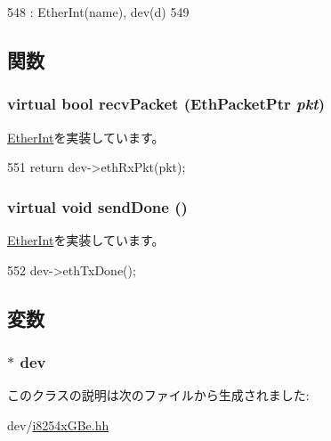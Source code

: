 \begin{DoxyCode}
548         : EtherInt(name), dev(d)
549     { }
\end{DoxyCode}


\subsection{関数}
\hypertarget{classIGbEInt_a9bd96a108d6f58f140c9f7d83726eebe}{
\subsubsection[{recvPacket}]{\setlength{\rightskip}{0pt plus 5cm}virtual bool recvPacket ({\bf EthPacketPtr} {\em pkt})}}
\label{classIGbEInt_a9bd96a108d6f58f140c9f7d83726eebe}


\hyperlink{classEtherInt_af3076ea966a2abda7735ea65e8a02034}{EtherInt}を実装しています。


\begin{DoxyCode}
551 { return dev->ethRxPkt(pkt); }
\end{DoxyCode}
\hypertarget{classIGbEInt_a967489e0b2900f4b12d99e6257d24dbe}{
\subsubsection[{sendDone}]{\setlength{\rightskip}{0pt plus 5cm}virtual void sendDone ()}}
\label{classIGbEInt_a967489e0b2900f4b12d99e6257d24dbe}


\hyperlink{classEtherInt_a5a2f0c04ee61250a128bc992d2118390}{EtherInt}を実装しています。


\begin{DoxyCode}
552 { dev->ethTxDone(); }
\end{DoxyCode}


\subsection{変数}
\hypertarget{classIGbEInt_a98d2ca35267d7f0e3548330b6311cb1c}{
\subsubsection[{dev}]{$\ast$ {\bf dev}}}
\label{classIGbEInt_a98d2ca35267d7f0e3548330b6311cb1c}


このクラスの説明は次のファイルから生成されました:\begin{DoxyCompactItemize}
\item 
dev/\hyperlink{i8254xGBe_8hh}{i8254xGBe.hh}\end{DoxyCompactItemize}
